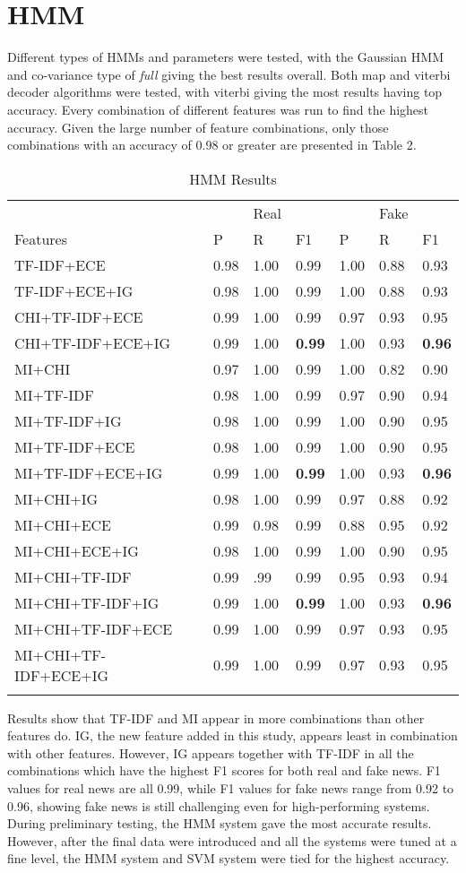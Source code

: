 \documentclass [11pt, proquest] {uwthesis}[2020/02/24]
\begin{document}
\section{HMM}
Different types of HMMs and parameters were tested, with the Gaussian HMM and co-variance type of \textit{full} giving the best results overall. Both map and viterbi decoder algorithms were tested, with viterbi giving the most results having top accuracy. Every combination of different features was run to find the highest accuracy. Given the large number of feature combinations, only those combinations with an accuracy of 0.98 or greater are presented in Table 2.
\begin{longtable}{p{8cm}p{1cm}p{1cm}p{1cm}p{1cm}p{1cm}p{1cm}}
  &&Real&&&Fake\\
 Features&P&R&F1&P&R&F1\\
 \hline
TF-IDF+ECE&0.98&1.00&0.99&1.00&0.88&0.93\\%
TF-IDF+ECE+IG&0.98&1.00&0.99&1.00&0.88&0.93\\ %
CHI+TF-IDF+ECE&0.99&1.00&0.99&0.97&0.93&0.95\\ %
CHI+TF-IDF+ECE+IG&0.99&1.00&\textbf{0.99}&1.00&0.93&\textbf{0.96}\\ %
MI+CHI&0.97&1.00&0.99&1.00&0.82&0.90\\%
MI+TF-IDF&0.98&1.00&0.99&0.97&0.90&0.94\\ %
MI+TF-IDF+IG&0.98&1.00&0.99&1.00&0.90&0.95\\%
MI+TF-IDF+ECE&0.98&1.00&0.99&1.00&0.90&0.95\\ %
MI+TF-IDF+ECE+IG&0.99&1.00&\textbf{0.99}&1.00&0.93&\textbf{0.96}\\
MI+CHI+IG&0.98&1.00&0.99&0.97&0.88&0.92\\ %
MI+CHI+ECE&0.99&0.98&0.99&0.88&0.95&0.92\\%
MI+CHI+ECE+IG&0.98&1.00&0.99&1.00&0.90&0.95\\ %
MI+CHI+TF-IDF&0.99&.99&0.99&0.95&0.93&0.94\\%
MI+CHI+TF-IDF+IG&0.99&1.00&\textbf{0.99}&1.00&0.93&\textbf{0.96}\\
MI+CHI+TF-IDF+ECE&0.99&1.00&0.99&0.97&0.93&0.95\\%
MI+CHI+TF-IDF+ECE+IG&0.99&1.00&0.99&0.97&0.93&0.95\\ %
\hline
\caption{HMM Results}
\end{longtable}
Results show that TF-IDF and MI appear in more combinations than other features do. IG, the new feature added in this study, appears least in combination with other features. However, IG appears together with TF-IDF in all the combinations which have the highest F1 scores for both real and fake news. F1 values for real news are all 0.99, while F1 values for fake news range from 0.92 to 0.96, showing fake news is still challenging even for high-performing systems. During preliminary testing, the HMM system gave the most accurate results. However, after the final data were introduced and all the systems were tuned at a fine level, the HMM system and SVM system were tied for the highest accuracy.
\end{document}
